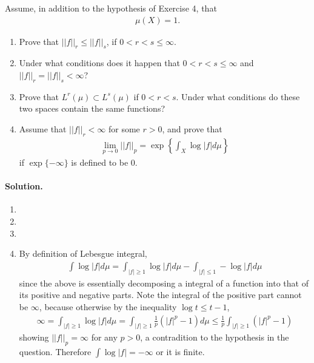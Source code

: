 \documentclass[../main.tex]{subfiles}
\begin{document}
  \begin{exercise}
    Assume, in addition to the hypothesis of Exercise 4, that
    \begin{align*}
      \mu(X) = 1.
    \end{align*}
    \begin{enumerate}
      \item Prove that $ ||f||_r \le ||f||_s $, if $ 0 < r < s \le \infty $.
      \item Under what conditions does it happen that $ 0 < r < s \le \infty $ and $ ||f||_r = ||f||_s < \infty $?
      \item Prove that $ L^r(\mu) \subset L^s(\mu) $ if $ 0 < r < s $. Under what conditions do these two spaces contain the same functions?
      \item Assume that $ ||f||_r < \infty $ for some $ r > 0 $, and prove that
      \begin{align*}
        \lim _{p \to 0} ||f||_p = \exp \left \{\int_X \log |f| d\mu \right \}
      \end{align*}
      if $ \exp \{-\infty\} $ is defined to be $ 0 $.

    \end{enumerate}

    \paragraph{Solution. }
    \begin{enumerate}
      \item
      \item
      \item
      \item By definition of Lebesgue integral,
      \begin{align*}
        \int \log |f| d\mu = \int _{|f| \ge 1} \log |f| d\mu - \int _{|f| \le 1} -\log|f| d\mu
      \end{align*}
      since the above is essentially decomposing a integral of a function into that of its positive and negative parts. Note the integral of the positive part cannot be $ \infty $, because otherwise by the inequality $ \log t \le t - 1 $,
      \begin{align*}
        \infty = \int _{|f| \ge 1} \log |f| d\mu = \int _{|f| \ge 1} \frac {1}{p} (|f|^p - 1) d\mu \le \frac {1}{p} \int _{|f| \ge 1} (|f|^p - 1)
      \end{align*}
      showing $ ||f||_p = \infty $ for any $ p > 0 $, a contradition to the hypothesis in the question. Therefore $ \int \log |f| = -\infty $ or it is finite.


\end{enumerate}
\end{exercise}
\end{document}
